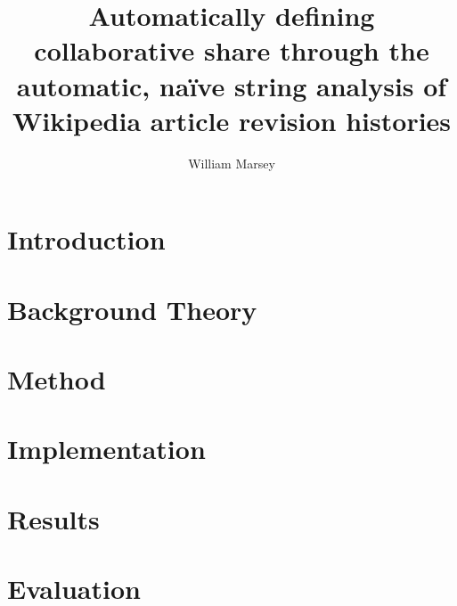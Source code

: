\documentclass[a4paper,11pt,twoside]{report}
\begin{document}
\title{\LARGE {\bf Automatically defining collaborative share through
    the automatic, na\"ive string analysis of Wikipedia article
    revision histories}\\
 \vspace*{6mm}
}

\author{William Marsey}

\maketitle

\preface



\body
{}
\chapter{Introduction}
\label{ch:introduction}


\chapter{Background Theory}
\label{ch:background}





\chapter{Method}
\label{chap:method}



\chapter{Implementation}
\label{ch:implementation}




\chapter{Results}
\label{ch:results}



\chapter{Evaluation}
\label{ch:evaluation}




\end{document}
